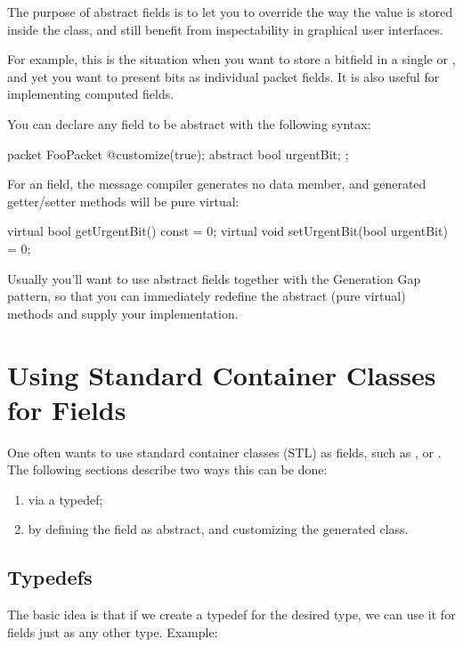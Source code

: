 The purpose of abstract fields is to let you to override the way the value
is stored inside the class, and still benefit from inspectability in
graphical user interfaces.

For example, this is the situation when you want to store a bitfield
in a single  or , and yet you want
to present bits as individual packet fields.
It is also useful for implementing computed fields.

You can declare any field to be abstract with the following syntax:

\begin{msg}
packet FooPacket
{
   @customize(true);
   abstract bool urgentBit;
};
\end{msg}

For an  field, the message compiler generates
no data member, and generated getter/setter methods will be pure
virtual:

\begin{cpp}
virtual bool getUrgentBit() const = 0;
virtual void setUrgentBit(bool urgentBit) = 0;
\end{cpp}


Usually you'll want to use abstract fields together with
the Generation Gap pattern, so that you can immediately
redefine the abstract (pure virtual) methods and
supply your implementation.



\section{Using Standard Container Classes for Fields}
\label{sec:ch-msg-defs:using-stl}

One often wants to use standard container classes (STL) as fields, such as
,  or . The following sections
describe two ways this can be done:

\begin{enumerate}
  \item via a typedef;
  \item by defining the field as abstract, and customizing the generated class.
\end{enumerate}

\subsection{Typedefs}

The basic idea is that if we create a typedef for the desired type,
we can use it for fields just as any other type. Example:

